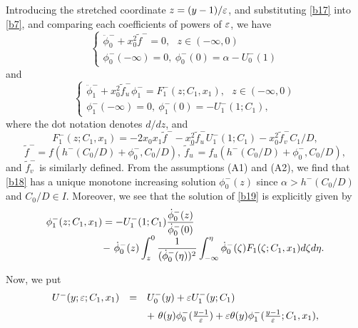 \documentclass[a4,10pt]{article}
\begin{document}
%
%
Introducing the stretched coordinate $z = (y-1)/\varepsilon$, and substituting 
\eqref{b17} into \eqref{b7}, and 
comparing each coefficients of powers of $\varepsilon$, we have 
%
\begin{equation}\label{b18}
\left \{
\begin{array}{l}
\ddot{\phi}_0^- + x_0^2 \tilde{f}^- = 0, \ \ \ z \in (-\infty, 0)  
 \\[1ex]
\phi^-_0(-\infty) = 0, \ \phi^-_0(0) = \alpha - U^-_0(1) 
\end{array} 
\right.
\end{equation}
%
and
%
\begin{equation}\label{b19}
\left \{
\begin{array}{l}
\ddot{\phi}_1^- + x_0^2 \tilde{f}^-_u \phi^-_1 = F_1^-(z;C_1,x_1), \ \ \ z \in (-\infty, 0)  
 \\[1ex]
\phi^-_1(-\infty) = 0, \ \phi^-_1(0) = -U^-_1(1;C_1),
\end{array} 
\right.
\end{equation}
%
%
where the dot notation denotes $d/dz$, and 
%
$$
F_1^-(z;C_1,x_1) =  -2x_0 x_1 \tilde{f}^- - x_0^2 \tilde{f}^-_u U^-_1(1;C_1) -x_0^2 \tilde{f}^-_v C_1/D ,
$$
%
%
$$ \tilde{f}^- = f( h^-(C_0/D) + \phi^-_0, C_0/D ), \ 
\tilde{f}^-_u = f_u( h^-(C_0/D) + \phi^-_0, C_0/D ),
$$
and $\tilde{f}^-_v$ is similarly defined. 
%
From the assumptions (A1) and (A2), 
we find that \eqref{b18} has a unique monotone
increasing solution $\phi^-_0(z)$ since $\alpha > h^-(C_0/D)$ and $C_0/D \in I$. 
Moreover, we see that the solution of \eqref{b19} 
is explicitly given by
%
\begin{equation}\label{b21}
\begin{array}{l}
\phi^-_1(z;C_1,x_1) = -U^-_1(1;C_1) \displaystyle\frac{ \dot{\phi}_0^-(z) }{ \dot{\phi}_0^-(0) } \\[1ex]
\hspace*{2cm} - \ \dot{\phi}_0^-(z)  \displaystyle\int_z^0 \frac{1}{ (\dot{\phi}_0^-(\eta))^2} 
\displaystyle\int_{-\infty}^{\eta}  \dot{\phi}_0^-(\zeta) 
F_1(\zeta;C_1,x_1) d\zeta d\eta. 
\end{array} 
\end{equation}
%
\par
Now, we put 
\begin{equation}\label{b22zz}
\begin{array}{lcl}
U^-(y;\varepsilon;C_1,x_1) & = & U^-_0(y) + \varepsilon U^-_1(y;C_1) \\[0.2cm]
 &  & + \ \theta(y)\phi^-_0( \frac{y-1}{\varepsilon}) 
+  \varepsilon \theta(y)\phi^-_1(  \frac{y-1}{\varepsilon};C_1,x_1) ,
\end{array}
\end{equation}
\end{document}
